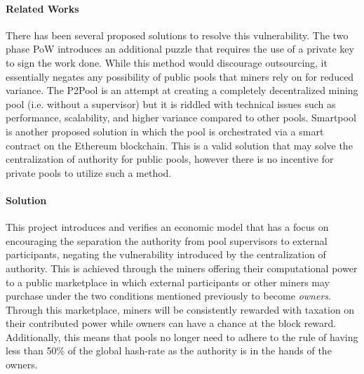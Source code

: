 \paragraph{Related Works} There has been several proposed solutions to resolve this vulnerability. The two phase PoW \cite{bastiaan2015} introduces an additional puzzle that requires the use of a private key to sign the work done. While this method would discourage outsourcing, it essentially negates any possibility of public pools that miners rely on for reduced variance. The P2Pool is an attempt at creating a completely decentralized mining pool (i.e. without a supervisor) but it is riddled with technical issues such as performance, scalability, and higher variance compared to other pools. Smartpool \cite{smartpool2017} is another proposed solution in which the pool is orchestrated via a smart contract on the Ethereum blockchain. This is a valid solution that may solve the centralization of authority for public pools, however there is no incentive for private pools to utilize such a method. 


\paragraph{Solution} This project introduces and verifies an economic model  that has a focus on encouraging the separation the authority from pool supervisors to external participants, negating the vulnerability introduced by the centralization of authority. This is achieved through the miners offering their computational power to a public marketplace in which external participants or other miners may purchase under the two conditions mentioned previously to become \textit{owners}. Through this marketplace, miners will be consistently rewarded with taxation on their contributed power while owners can have a chance at the block reward. Additionally, this means that pools no longer need to adhere to the rule of having less than 50\% of the global hash-rate as the authority is in the hands of the owners. 


